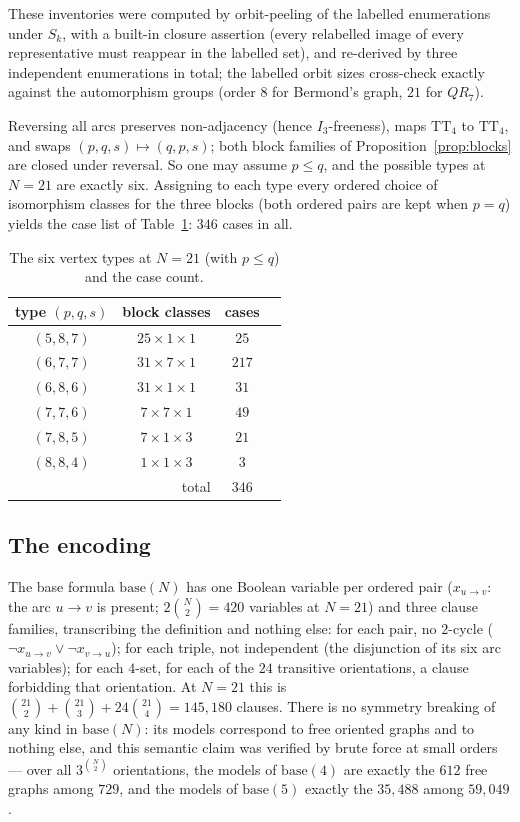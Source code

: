 \documentclass[11pt]{amsart}
\newcommand{\TT}[1]{\mathrm{TT}_{#1}}
\newcommand{\I}[1]{I_{#1}}
\theoremstyle{plain}
\theoremstyle{definition}
\theoremstyle{remark}
\begin{document}
These inventories were computed by orbit-peeling of the labelled
enumerations under $S_k$, with a built-in closure assertion (every
relabelled image of every representative must reappear in the labelled
set), and re-derived by three independent enumerations in total; the
labelled orbit sizes cross-check exactly against the automorphism
groups (order $8$ for Bermond's graph, $21$ for $QR_7$).

Reversing all arcs preserves non-adjacency (hence $\I3$-freeness), maps
$\TT{4}$ to $\TT{4}$, and swaps $(p,q,s)\mapsto(q,p,s)$; both block
families of Proposition~\ref{prop:blocks} are closed under reversal. So
one may assume $p\le q$, and the possible types at $N=21$ are exactly
six. Assigning to each type every ordered choice of isomorphism classes
for the three blocks (both ordered pairs are kept when $p=q$) yields the
case list of Table~\ref{tab:types}: $346$ cases in all.

\begin{table}[ht]
\begin{center}
\begin{tabular}{cccc}
\toprule
type $(p,q,s)$ & block classes & cases \\
\midrule
$(5,8,7)$ & $25\times 1\times 1$ & $25$ \\
$(6,7,7)$ & $31\times 7\times 1$ & $217$ \\
$(6,8,6)$ & $31\times 1\times 1$ & $31$ \\
$(7,7,6)$ & $7\times 7\times 1$ & $49$ \\
$(7,8,5)$ & $7\times 1\times 3$ & $21$ \\
$(8,8,4)$ & $1\times 1\times 3$ & $3$ \\
\midrule
\multicolumn{2}{r}{total} & $346$ \\
\bottomrule
\end{tabular}
\end{center}
\caption{The six vertex types at $N=21$ (with $p\le q$) and the case
count.}
\label{tab:types}
\end{table}

\subsection{The encoding}\label{ssec:encoding}
The base formula $\mathrm{base}(N)$ has one Boolean variable per ordered
pair ($x_{u\to v}$: the arc $u\to v$ is present; $2\binom{N}{2}=420$
variables at $N=21$) and three clause families, transcribing the
definition and nothing else: for each pair, no $2$-cycle
($\lnot x_{u\to v}\lor\lnot x_{v\to u}$); for each triple, not
independent (the disjunction of its six arc variables); for each
$4$-set, for each of the $24$ transitive orientations, a clause
forbidding that orientation. At $N=21$ this is
$\binom{21}{2}+\binom{21}{3}+24\binom{21}{4}=145{,}180$ clauses. There
is no symmetry breaking of any kind in $\mathrm{base}(N)$: its models
correspond to free oriented graphs and to nothing else, and this
semantic claim was verified by brute force at small orders --- over all
$3^{\binom{N}{2}}$ orientations, the models of $\mathrm{base}(4)$ are
exactly the $612$ free graphs among $729$, and the models of
$\mathrm{base}(5)$ exactly the $35{,}488$ among $59{,}049$.
\end{document}
